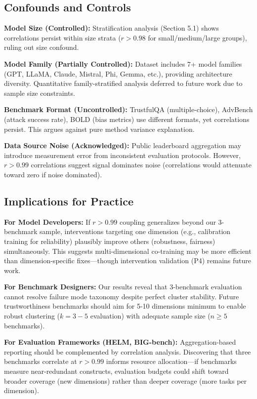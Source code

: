 \subsection{Confounds and Controls}

\textbf{Model Size (Controlled):} Stratification analysis (Section 5.1) shows correlations persist within size strata ($r > 0.98$ for small/medium/large groups), ruling out size confound.

\textbf{Model Family (Partially Controlled):} Dataset includes 7+ model families (GPT, LLaMA, Claude, Mistral, Phi, Gemma, etc.), providing architecture diversity. Quantitative family-stratified analysis deferred to future work due to sample size constraints.

\textbf{Benchmark Format (Uncontrolled):} TrustfulQA (multiple-choice), AdvBench (attack success rate), BOLD (bias metrics) use different formats, yet correlations persist. This argues against pure method variance explanation.

\textbf{Data Source Noise (Acknowledged):} Public leaderboard aggregation may introduce measurement error from inconsistent evaluation protocols. However, $r > 0.99$ correlations suggest signal dominates noise (correlations would attenuate toward zero if noise dominated).

\subsection{Implications for Practice}

\textbf{For Model Developers:} If $r > 0.99$ coupling generalizes beyond our 3-benchmark sample, interventions targeting one dimension (e.g., calibration training for reliability) plausibly improve others (robustness, fairness) simultaneously. This suggests multi-dimensional co-training may be more efficient than dimension-specific fixes---though intervention validation (P4) remains future work.

\textbf{For Benchmark Designers:} Our results reveal that 3-benchmark evaluation cannot resolve failure mode taxonomy despite perfect cluster stability. Future trustworthiness benchmarks should aim for 5-10 dimensions minimum to enable robust clustering ($k=3-5$ evaluation) with adequate sample size ($n \geq 5$ benchmarks).

\textbf{For Evaluation Frameworks (HELM, BIG-bench):} Aggregation-based reporting should be complemented by correlation analysis. Discovering that three benchmarks correlate at $r > 0.99$ informs resource allocation---if benchmarks measure near-redundant constructs, evaluation budgets could shift toward broader coverage (new dimensions) rather than deeper coverage (more tasks per dimension).

